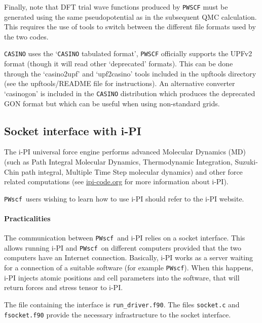 \documentclass[12pt,a4paper]{article}
\def\PWscf{\texttt{PWscf}}
\begin{document}
Finally, note that DFT trial wave functions produced by \texttt{PWSCF}
must be generated using the same pseudopotential as in the subsequent QMC 
calculation. This requires the use of tools to switch between the different 
file formats used by the two codes.

\texttt{CASINO} uses the `\texttt{CASINO} tabulated format', \texttt{PWSCF} officially supports 
the UPFv2 format (though it will read other `deprecated' formats).
This can be done through the `casino2upf' and `upf2casino' tools included in the upftools directory (see the upftools/README file for instructions). An alternative converter `casinogon' is included in the \texttt{CASINO} distribution which produces the deprecated GON format but which can be useful when using non-standard grids.

\subsection{Socket interface with i-PI}

The i-PI universal force engine performs advanced Molecular Dynamics
(MD) (such as Path Integral Molecular Dynamics, Thermodynamic
Integration, Suzuki-Chin path integral, Multiple Time Step molecular
dynamics) and other force related computations (see \url{ipi-code.org}
for more information about i-PI).  

\PWscf\ users wishing to learn how to use i-PI should refer to the i-PI website.

\paragraph{Practicalities}
The communication between \PWscf\ and i-PI relies on a socket
interface. This allows running i-PI and \PWscf\ on different computers
provided that the two computers have an Internet
connection. Basically, i-PI works as a server waiting for a connection
of a suitable software (for example \PWscf). When this happens, i-PI
injects atomic positions and cell parameters into the software, that
will return forces and stress tensor to i-PI.  

The file containing the interface is \verb#run_driver.f90#. The files
\verb#socket.c# and \verb#fsocket.f90# provide the necessary
infrastructure to the socket interface.  
\end{document}
